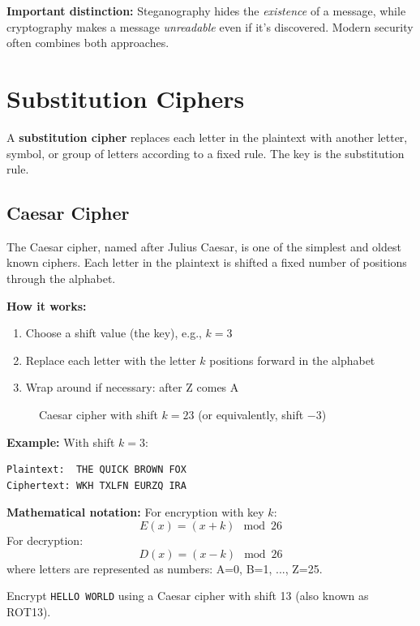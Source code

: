 \documentclass[11pt,a4paper]{report}
\begin{document}
\textbf{Important distinction:} Steganography hides the \emph{existence} of a message, while cryptography makes a message \emph{unreadable} even if it's discovered. Modern security often combines both approaches.

\newpage
\section{Substitution Ciphers}

A \textbf{substitution cipher} replaces each letter in the plaintext with another letter, symbol, or group of letters according to a fixed rule. The key is the substitution rule.

\subsection{Caesar Cipher}

The Caesar cipher, named after Julius Caesar, is one of the simplest and oldest known ciphers. Each letter in the plaintext is shifted a fixed number of positions through the alphabet.

\textbf{How it works:}
\begin{enumerate}
\item Choose a shift value (the key), e.g., $k = 3$
\item Replace each letter with the letter $k$ positions forward in the alphabet
\item Wrap around if necessary: after Z comes A
\end{enumerate}

\begin{figure}[h]
\caption{Caesar cipher with shift $k=23$ (or equivalently, shift $-3$)}
\end{figure}

\textbf{Example:} With shift $k=3$:
\begin{verbatim}
Plaintext:  THE QUICK BROWN FOX
Ciphertext: WKH TXLFN EURZQ IRA
\end{verbatim}

\textbf{Mathematical notation:}
For encryption with key $k$:
\[ E(x) = (x + k) \mod 26 \]
For decryption:
\[ D(x) = (x - k) \mod 26 \]
where letters are represented as numbers: A=0, B=1, ..., Z=25.

\begin{ex}
Encrypt \verb|HELLO WORLD| using a Caesar cipher with shift 13 (also known as ROT13).
\end{ex}
\end{document}
